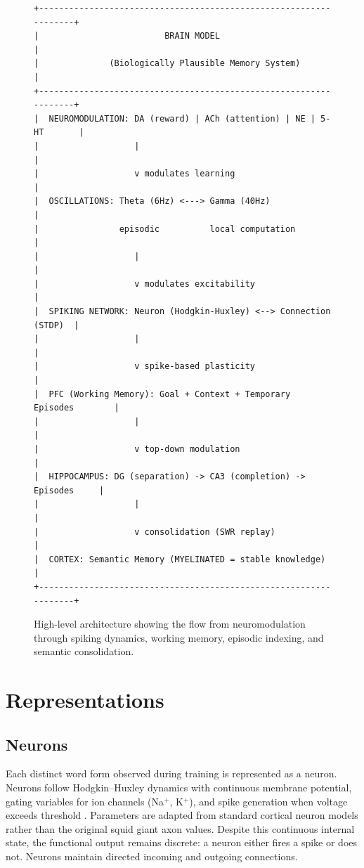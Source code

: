 \documentclass[11pt]{article}
\begin{document}
\begin{figure}[ht]
\centering
\begin{Verbatim}[fontsize=\scriptsize,frame=single]
+------------------------------------------------------------------+
|                         BRAIN MODEL                               |
|              (Biologically Plausible Memory System)               |
+------------------------------------------------------------------+
|  NEUROMODULATION: DA (reward) | ACh (attention) | NE | 5-HT       |
|                   |                                               |
|                   v modulates learning                            |
|  OSCILLATIONS: Theta (6Hz) <---> Gamma (40Hz)                     |
|                episodic          local computation                |
|                   |                                               |
|                   v modulates excitability                        |
|  SPIKING NETWORK: Neuron (Hodgkin-Huxley) <--> Connection (STDP)  |
|                   |                                               |
|                   v spike-based plasticity                        |
|  PFC (Working Memory): Goal + Context + Temporary Episodes        |
|                   |                                               |
|                   v top-down modulation                           |
|  HIPPOCAMPUS: DG (separation) -> CA3 (completion) -> Episodes     |
|                   |                                               |
|                   v consolidation (SWR replay)                    |
|  CORTEX: Semantic Memory (MYELINATED = stable knowledge)          |
+------------------------------------------------------------------+
\end{Verbatim}
\caption{High-level architecture showing the flow from neuromodulation through spiking dynamics, working memory, episodic indexing, and semantic consolidation.}
\label{fig:architecture}
\end{figure}

\section{Representations}

\subsection{Neurons}

Each distinct word form observed during training is represented as a neuron.
Neurons follow Hodgkin--Huxley dynamics with continuous membrane potential, gating variables for ion channels (Na$^+$, K$^+$), and spike generation when voltage exceeds threshold \citep{hodgkin1952quantitative}. Parameters are adapted from standard cortical neuron models rather than the original squid giant axon values. Despite this continuous internal state, the functional output remains discrete: a neuron either fires a spike or does not. Neurons maintain directed incoming and outgoing connections.
\end{document}
